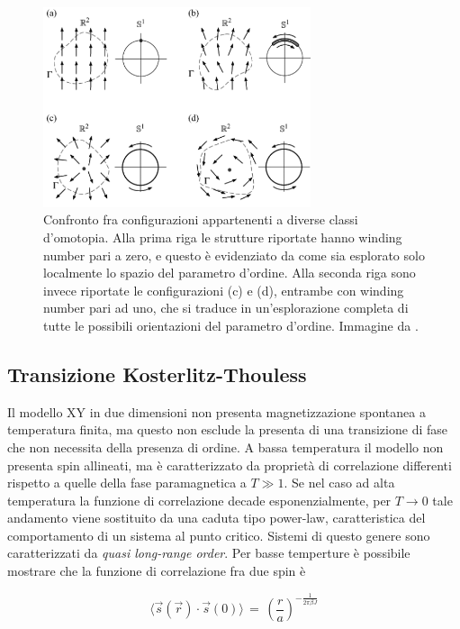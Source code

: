 \begin{figure}[H]
    \centering
    \includegraphics[width=0.7\textwidth]{Immagini/homCl_XY.png}
    \caption{Confronto fra configurazioni appartenenti a diverse classi d'omotopia. Alla prima riga le strutture riportate hanno winding 
    number pari a zero, e questo è evidenziato da come sia esplorato solo localmente lo spazio del parametro d'ordine. Alla seconda riga sono 
    invece riportate le configurazioni (c) e (d), entrambe con winding number pari ad uno, che si traduce in un'esplorazione completa di tutte le 
    possibili orientazioni del parametro d'ordine. Immagine da \cite{galliFSA}.}
    \label{fig: homCl_XY}
\end{figure}





\subsection{Transizione Kosterlitz-Thouless}

Il modello XY in due dimensioni non presenta magnetizzazione spontanea a temperatura finita, ma questo non esclude la presenta di una transizione 
di fase che non necessita della presenza di ordine. A bassa temperatura il modello non presenta spin allineati, ma è caratterizzato 
da proprietà di correlazione differenti rispetto a quelle della fase paramagnetica a $T \gg 1$. Se nel caso ad alta temperatura la 
funzione di correlazione decade esponenzialmente, per $T \to 0$ tale andamento viene sostituito da una caduta tipo power-law, caratteristica 
del comportamento di un sistema al punto critico. Sistemi di questo genere sono caratterizzati da \textit{quasi long-range order}. 
Per basse temperture è possibile mostrare che la funzione di correlazione fra due spin è 

\begin{equation}
    \langle \vec{s}\left(\vec{r}\right) \cdot \vec{s}\left(0\right) \rangle\,=\,\left(\frac{r}{a}\right)^{-\frac{1}{2 \pi \beta J}}
    \label{eq: corr_XY_KT}
\end{equation}

